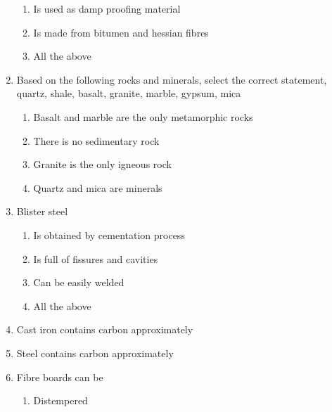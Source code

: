 \documentclass[11pt,a4paper]{article}
\begin{document}
\begin{enumerate}
\begin{enumerate}[label=\Alph*.]
\item{Is used as damp proofing material}
\item{Is made from bitumen and hessian fibres}
\item{All the above}
\end{enumerate}
\item{Based on the following rocks and minerals, select the correct statement, quartz, shale, basalt, granite, marble, gypsum, mica}
\begin{enumerate}[label=\Alph*.]
\item{Basalt and marble are the only metamorphic rocks}
\item{There is no sedimentary rock}
\item{Granite is the only igneous rock}
\item{Quartz and mica are minerals}
\end{enumerate}
\item{Blister steel}
\begin{enumerate}[label=\Alph*.]
\item{Is obtained by cementation process}
\item{Is full of fissures and cavities}
\item{Can be easily welded}
\item{All the above}
\end{enumerate}
\item{Cast iron contains carbon approximately}
\\
\item{Steel contains carbon approximately}
\\
\item{Fibre boards can be}
\begin{enumerate}[label=\Alph*.]
\item{Distempered}

\end{enumerate}
\end{enumerate}
\end{document}
